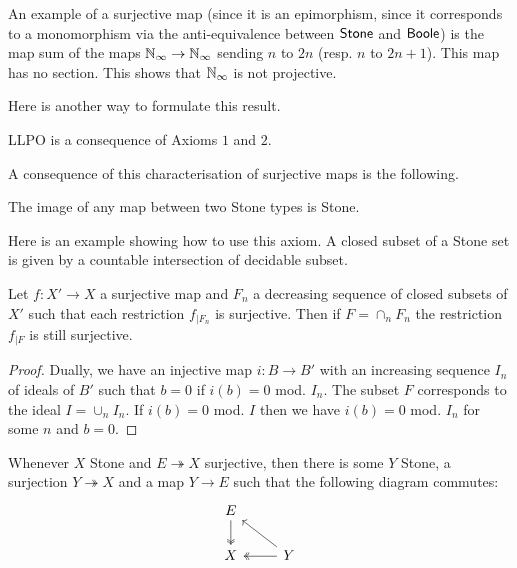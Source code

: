 An example of a surjective map (since it is an epimorphism, since it corresponds to a monomorphism via the anti-equivalence
between $\mathsf{Stone}$ and $\mathsf{Boole}$) is the map sum of the maps $\mathbb{N}_{\infty}\rightarrow \mathbb{N}_{\infty}$ sending $n$ to $2n$ (resp. $n$ to $2n+1$).
This map has no section. This shows that $\mathbb{N}_{\infty}$ is not projective.

Here is another way to formulate this result.

\begin{proposition}
  LLPO is a consequence of Axioms $1$ and $2$.
\end{proposition}

A consequence of this characterisation of surjective maps is the following.

\begin{proposition}
  The image of any map between two Stone types is Stone.
\end{proposition}

Here is an example showing how to use this axiom. A closed subset of a Stone set is given by a countable
intersection of decidable subset.

\begin{proposition}
  Let $f:X'\rightarrow X$ a surjective map and $F_n$ a decreasing sequence of closed subsets of $X'$ such that
  each restriction $f_{|F_n}$ is surjective. Then if $F = \cap_n F_n$ the restriction $f_{|F}$ is still surjective.
\end{proposition}

\begin{proof}
  Dually, we have an injective map $i:B\rightarrow B'$ with an increasing sequence $I_n$ of ideals of $B'$ such that
  $b = 0$ if $i(b) = 0$ mod. $I_n$. The subset $F$ corresponds to the ideal $I = \cup_n I_n$. If $i(b) = 0$ mod. $I$
  then we have $i(b) = 0$ mod. $I_n$ for some $n$ and $b = 0$. 
\end{proof}





\begin{axiom}
  Whenever $X$ Stone and $E\twoheadrightarrow X$ surjective, then there is some $Y$ Stone,
    a surjection $Y \twoheadrightarrow X$ and a map $Y\to E$ such that the following diagram commutes:
    \begin{equation}\begin{tikzcd}
      E \arrow[d,""',two heads]\\
      X & \arrow[l, "", two heads] Y\arrow[lu, ""']
    \end{tikzcd}\end{equation}  
\end{axiom} 




